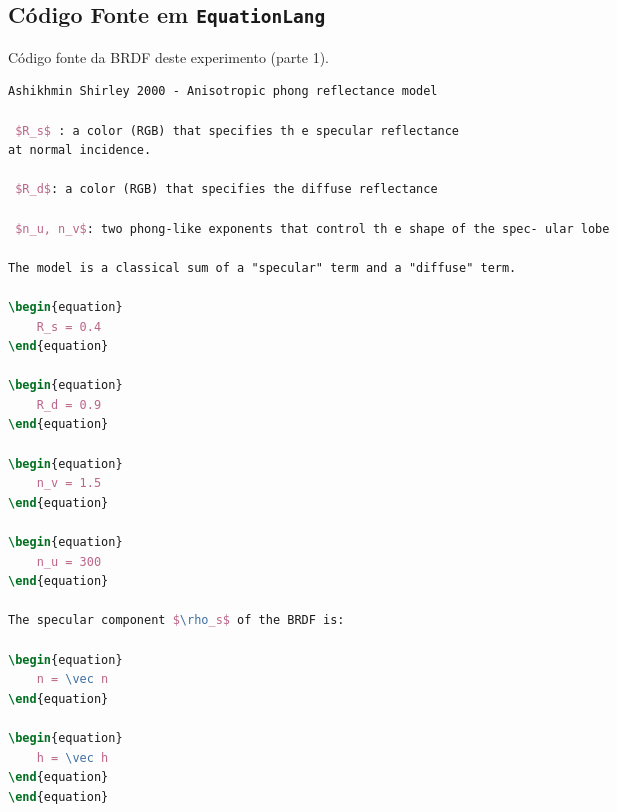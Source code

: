 \subsection{Código Fonte em \texttt{EquationLang}}
\begin{codigo}[H]
    \caption{\small Código fonte da BRDF deste experimento (parte 1).}
    \label{cod-ashikhmin-shirley-close-to-original-eqlang-pt-1}
\begin{lstlisting}[language=tex, frame=none, inputencoding=utf8]
Ashikhmin Shirley 2000 - Anisotropic phong reflectance model

 $R_s$ : a color (RGB) that specifies th e specular reflectance
at normal incidence.

 $R_d$: a color (RGB) that specifies the diffuse reflectance

 $n_u, n_v$: two phong-like exponents that control th e shape of the spec- ular lobe

The model is a classical sum of a "specular" term and a "diffuse" term.

\begin{equation}
    R_s = 0.4
\end{equation}

\begin{equation}
    R_d = 0.9
\end{equation}

\begin{equation}
    n_v = 1.5
\end{equation}

\begin{equation}
    n_u = 300
\end{equation}

The specular component $\rho_s$ of the BRDF is:

\begin{equation}
    n = \vec n
\end{equation}

\begin{equation}
    h = \vec h
\end{equation}
\end{equation}
\end{lstlisting}
\end{codigo}



